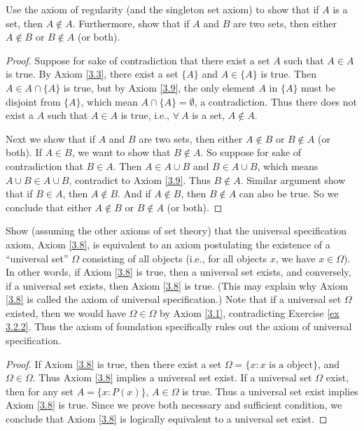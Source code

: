 \begin{exercise}\label{ex 3.2.2}
Use the axiom of regularity (and the singleton set axiom) to show that if \(A\) is a set, then \(A \notin A\).
Furthermore, show that if \(A\) and \(B\) are two sets, then either \(A \notin B\) or \(B \notin A\) (or both).
\end{exercise}

\begin{proof}
Suppose for sake of contradiction that there exist a set \(A\) such that \(A \in A\) is true.
By Axiom \ref{3.3}, there exist a set \(\{A\}\) and \(A \in \{A\}\) is true.
Then \(A \in A \cap \{A\}\) is true, but by Axiom \ref{3.9}, the only element \(A\) in \(\{A\}\) must be disjoint from \(\{A\}\), which mean \(A \cap \{A\} = \emptyset\), a contradiction.
Thus there does not exist a \(A\) such that \(A \in A\) is true, i.e., \(\forall\ A\) is a set, \(A \notin A\).

Next we show that if \(A\) and \(B\) are two sets, then either \(A \notin B\) or \(B \notin A\) (or both).
If \(A \in B\), we want to show that \(B \notin A\).
So suppose for sake of contradiction that \(B \in A\).
Then \(A \in A \cup B\) and \(B \in A \cup B\), which means \(A \cup B \in A \cup B\), contradict to Axiom \ref{3.9}.
Thus \(B \notin A\).
Similar argument show that if \(B \in A\), then \(A \notin B\).
And if \(A \notin B\), then \(B \notin A\) can also be true.
So we conclude that either \(A \notin B\) or \(B \notin A\) (or both).
\end{proof}

\begin{exercise}\label{ex 3.2.3}
Show (assuming the other axioms of set theory) that the universal specification axiom, Axiom \ref{3.8}, is equivalent to an axiom postulating the existence of a ``universal set'' \(\Omega\) consisting of all objects (i.e., for all objects \(x\), we have \(x \in \Omega\)).
In other words, if Axiom \ref{3.8} is true, then a universal set exists, and conversely, if a universal set exists, then Axiom \ref{3.8} is true.
(This may explain why Axiom \ref{3.8} is called the axiom of universal specification.)
Note that if a universal set \(\Omega\) existed, then we would have \(\Omega \in \Omega\) by Axiom \ref{3.1}, contradicting Exercise \ref{ex 3.2.2}.
Thus the axiom of foundation specifically rules out the axiom of universal specification.
\end{exercise}

\begin{proof}
If Axiom \ref{3.8} is true, then there exist a set \(\Omega = \{x: x \text{ is a object}\}\), and \(\Omega \in \Omega\).
Thus Axiom \ref{3.8} implies a universal set exist.
If a universal set \(\Omega\) exist, then for any set \(A = \{x: P(x)\}\), \(A \in \Omega\) is true.
Thus a universal set exist implies Axiom \ref{3.8} is true.
Since we prove both necessary and sufficient condition, we conclude that Axiom \ref{3.8} is logically equivalent to a universal set exist.
\end{proof}